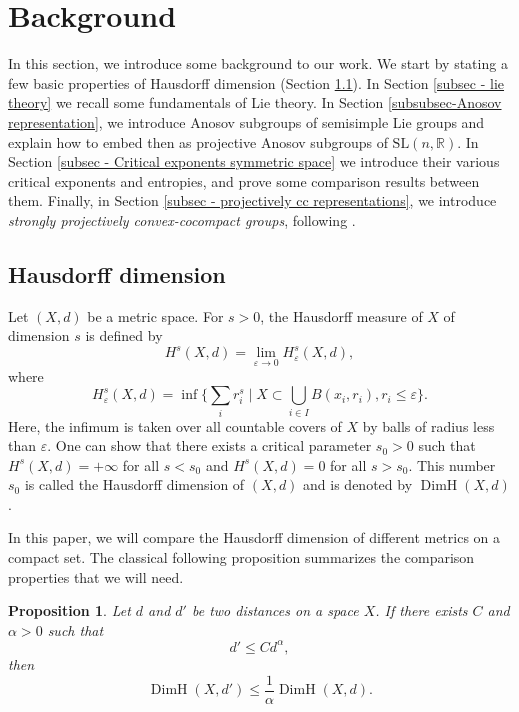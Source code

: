 \documentclass[JEP,XML,SOM,Unicode,NoEqCountersInSection,NoFloatCountersInSection,published]{cedram}
\newtheorem{prop}[theo]{Proposition}
\theoremstyle{definition}
\newcommand{\R}{\mathbb{R}}
\newcommand{\SL}{\mathrm{SL}}
\DeclareMathOperator{\DimH}{DimH}
\let\epsilon\varepsilon
\begin{document}
\section{Background} \label{sec - Background}

In this section, we introduce some background to our work. We start by stating a few basic properties of Hausdorff dimension (Section \ref{subsec - hausdorff dimension}). In Section \ref{subsec - lie theory} we recall some fundamentals of Lie theory. In Section \ref{subsubsec-Anosov representation}, we introduce Anosov subgroups of semisimple Lie groups and explain how to embed then as projective Anosov subgroups of $\SL(n,\R)$. In Section \ref{subsec - Critical exponents symmetric space} we introduce their various critical exponents and entropies, and prove some comparison results between them. Finally, in Section \ref{subsec - projectively cc representations}, we introduce \emph{strongly projectively convex-cocompact groups}, following \cite{DGK}.

\subsection{Hausdorff dimension} \label{subsec - hausdorff dimension}

Let $(X,d)$ be a metric space. For $s>0$, the Hausdorff measure of $X$ of dimension $s$ is defined by\vspace*{-3pt}
\[H^s(X,d) = \lim_{\epsilon\to 0} H^s_\epsilon(X,d),\]
where\vspace*{-3pt}
\[\textstyle
H^s_\epsilon(X,d) = \inf \bigl\{ \sum_i r_i^s \mid X \subset \bigcup_{i\in I} B(x_i, r_i), r_i \leq \epsilon\bigr\}.\]
Here, the infimum is taken over all countable covers of $X$ by balls of radius less than $\epsilon$.
One can show that there exists a critical parameter $s_0>0$ such that $H^s(X,d) = +\infty$ for all $s<s_0$ and $H^s(X,d) = 0$ for all $s>s_0$. This number $s_0$ is called the Hausdorff dimension of $(X,d)$ and is denoted by $\DimH(X,d)$.

In this paper, we will compare the Hausdorff dimension of different metrics on a compact set. The classical following proposition summarizes the comparison properties that we will need.
\begin{prop} \label{p:GeneralComparisonHDim}
Let $d$ and $d'$ be two distances on a space $X$. If there exists $C$ and $\alpha>0$ such that
\[d' \leq C d^{\alpha},\]
then
\[\DimH(X,d') \leq \frac{1}{\alpha} \DimH(X,d).\]
\end{prop}
\end{document}
